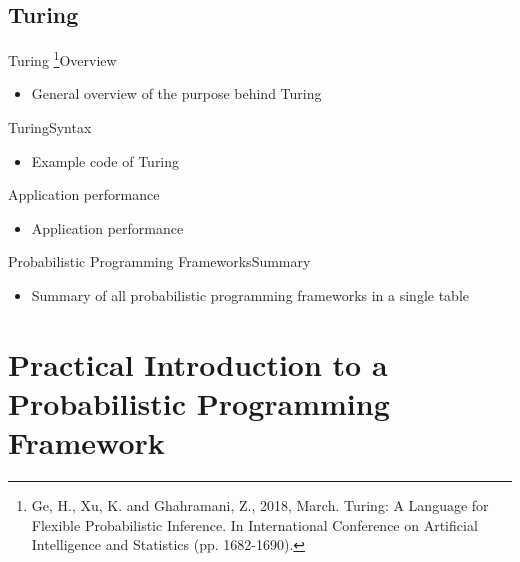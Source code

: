 \documentclass[AERbeamer%
              ,optEnglish%
              ,optBiber%
              ,optBibstyleAlphabetic%
              ,optBeamerClassicFormat%
              ]{AERlatex}%
\begin{document}
\subsection{Turing}
\begin{frame}[c]{Turing \footnote{Ge, H., Xu, K. and Ghahramani, Z., 2018, March. Turing: A Language for Flexible
                                  Probabilistic Inference. In International Conference on Artificial Intelligence
                                  and Statistics (pp. 1682-1690).}}{Overview}
    \centering
    \begin{itemize}
        \item General overview of the purpose behind Turing
    \end{itemize}
\end{frame}


\begin{frame}[c]{Turing}{Syntax}
    \centering
    \begin{itemize}
        \item Example code of Turing
    \end{itemize}
\end{frame}


\begin{frame}[c]{Application performance}
    \centering
    \begin{itemize}
        \item Application performance
    \end{itemize}
\end{frame}


\begin{frame}[c]{Probabilistic Programming Frameworks}{Summary}
    \centering
    \begin{itemize}
        \item Summary of all probabilistic programming frameworks in a single table
    \end{itemize}
\end{frame}



\section{Practical Introduction to a Probabilistic Programming Framework}
\end{document}
